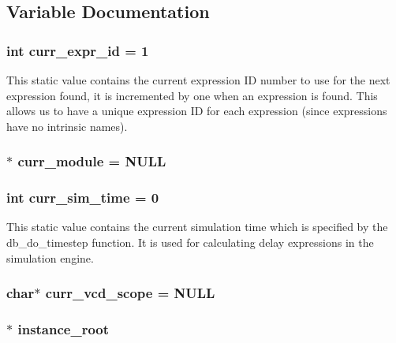 \subsection{Variable Documentation}
\subsubsection{\setlength{\rightskip}{0pt plus 5cm}int curr\_\-expr\_\-id = 1}\label{db_8c_a11}


This static value contains the current expression ID number to use for the next expression found, it is incremented by one when an expression is found. This allows us to have a unique expression ID for each expression (since expressions have no intrinsic names). 
\subsubsection{$\ast$ curr\_\-module = NULL}\label{db_8c_a7}


\subsubsection{\setlength{\rightskip}{0pt plus 5cm}int curr\_\-sim\_\-time = 0}\label{db_8c_a12}


This static value contains the current simulation time which is specified by the db\_\-do\_\-timestep function. It is used for calculating delay expressions in the simulation engine. 
\subsubsection{\setlength{\rightskip}{0pt plus 5cm}char$\ast$ curr\_\-vcd\_\-scope = NULL}\label{db_8c_a2}


\subsubsection{$\ast$ instance\_\-root}\label{db_8c_a1}


